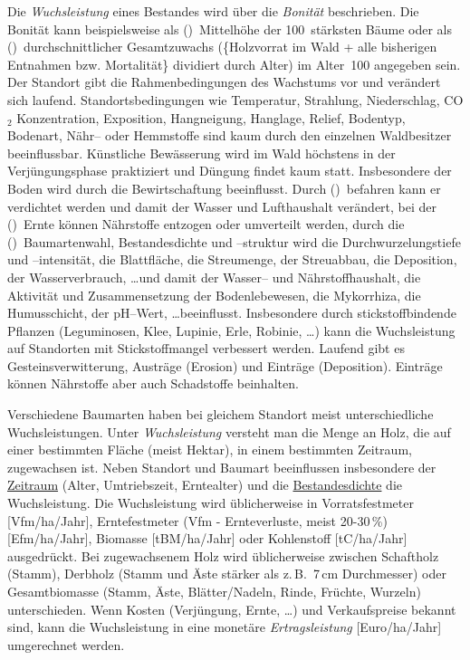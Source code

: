 \documentclass[twocolumn]{scrartcl}
\begin{document}
Die \emph{Wuchsleistung} eines Bestandes wird über die \emph{Bonität}
beschrieben. Die Bonität kann beispielsweise als (\textbullet)~Mittelhöhe der
100~stärksten Bäume oder als (\textbullet)~durchschnittlicher Gesamtzuwachs
(\{Holzvorrat im Wald + alle bisherigen Entnahmen bzw. Mortalität\} dividiert
durch Alter) im Alter~100 angegeben sein. Der Standort gibt die
Rahmenbedingungen des Wachstums vor und verändert sich laufend.
Standortsbedingungen wie Temperatur, Strahlung, Niederschlag, CO$_2$
Konzentration, Exposition, Hangneigung, Hanglage, Relief, Bodentyp, Bodenart,
Nähr-- oder Hemmstoffe sind kaum durch den einzelnen Waldbesitzer beeinflussbar.
Künstliche Bewässerung wird im Wald höchstens in der Verjüngungsphase
praktiziert und Düngung findet kaum statt. Insbesondere der Boden wird durch die
Bewirtschaftung beeinflusst. Durch (\textbullet)~befahren kann er verdichtet
werden und damit der Wasser und Lufthaushalt verändert, bei der
(\textbullet)~Ernte können Nährstoffe entzogen oder umverteilt werden, durch die
(\textbullet)~Baumartenwahl, Bestandesdichte und --struktur wird die
Durchwurzelungstiefe und --intensität, die Blattfläche, die Streumenge, der
Streuabbau, die Deposition, der Wasserverbrauch, \dots und damit der Wasser--
und Nährstoffhaushalt, die Aktivität und Zusammensetzung der Bodenlebewesen, die
Mykorrhiza, die Humusschicht, der pH--Wert, \dots beeinflusst. Insbesondere
durch stickstoffbindende Pflanzen (Leguminosen, Klee, Lupinie, Erle, Robinie,
\dots) kann die Wuchsleistung auf Standorten mit Stickstoffmangel verbessert
werden. Laufend gibt es Gesteinsverwitterung, Austräge (Erosion) und Einträge
(Deposition). Einträge können Nährstoffe aber auch Schadstoffe beinhalten.

Verschiedene Baumarten haben bei gleichem Standort meist unterschiedliche
Wuchsleistungen. Unter \emph{Wuchsleistung} versteht man
die Menge an Holz, die auf einer bestimmten Fläche (meist Hektar), in einem
bestimmten Zeitraum, zugewachsen ist. Neben Standort und Baumart beeinflussen
insbesondere der \hyperref[sec:AlterUndErntezeitpunkt]{Zeitraum} (Alter,
Umtriebszeit, Erntealter) und die
\hyperref[sec:StammzahlUndBestandesdichte]{Bestandesdichte} die Wuchsleistung.
Die Wuchsleistung wird üblicherweise in Vorratsfestmeter [Vfm/ha/Jahr],
Erntefestmeter (Vfm - Ernteverluste, meist 20-30\,\%) [Efm/ha/Jahr], Biomasse
[tBM/ha/Jahr] oder Kohlenstoff [tC/ha/Jahr] ausgedrückt. Bei zugewachsenem Holz
wird üblicherweise zwischen Schaftholz (Stamm), Derbholz (Stamm und Äste stärker
als z.\,B.\ 7\,cm Durchmesser) oder Gesamtbiomasse (Stamm, Äste, Blätter/Nadeln,
Rinde, Früchte, Wurzeln) unterschieden. Wenn Kosten (Verjüngung, Ernte, \dots)
und Verkaufspreise bekannt sind, kann die Wuchsleistung in eine monetäre
\emph{Ertragsleistung} [Euro/ha/Jahr] umgerechnet werden.
\end{document}
